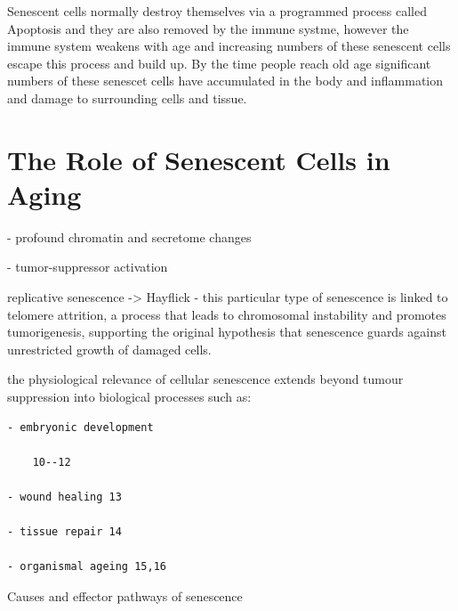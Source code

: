 \documentclass[
]{book}
\begin{document}
Senescent cells normally destroy themselves via a programmed process called Apoptosis and they are also removed by the immune systme, however the immune system weakens with age and increasing numbers of these senescent cells escape this process and build up. By the time people reach old age significant numbers of these senescet cells have accumulated in the body and inflammation and damage to surrounding cells and tissue.

\hypertarget{the-role-of-senescent-cells-in-aging}{%
\section{The Role of Senescent Cells in Aging}\label{the-role-of-senescent-cells-in-aging}}

- profound chromatin and secretome changes

- tumor-suppressor activation

replicative senescence -\textgreater{} Hayflick - this particular type of senescence is linked to telomere attrition, a process that leads to chromosomal instability and promotes tumorigenesis, supporting the original hypothesis that senescence guards against unrestricted growth of damaged cells.

the physiological relevance of cellular senescence extends beyond tumour suppression into biological processes such as:

\begin{verbatim}
- embryonic development

    10--12

- wound healing 13

- tissue repair 14

- organismal ageing 15,16
\end{verbatim}

Causes and effector pathways of senescence
\end{document}
